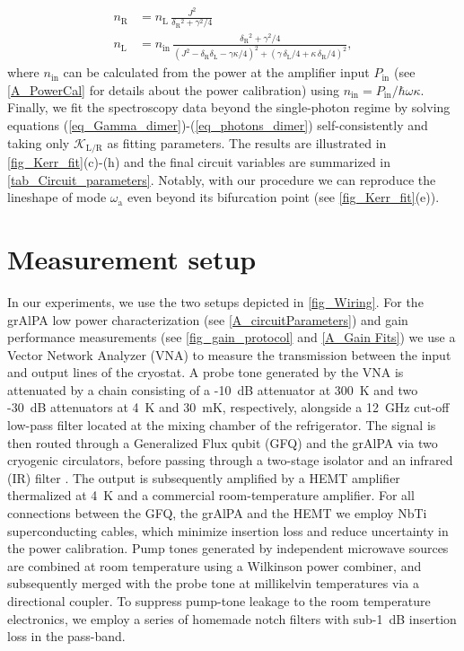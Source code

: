 \documentclass[%
reprint,
floatfix,
superscriptaddress,
amsmath,amssymb,
aps,
pra,
]{revtex4-2}
\begin{document}
\begin{subequations}
\begin{align}
n\mathrm{_{R}} & = n\mathrm{_{L}}\,\frac{J^2}{\delta\mathrm{_R}^2+\gamma^2/4}
\\
n\mathrm{_{L}}  & = n\mathrm{_{in}}\,\frac{\delta\mathrm{_R}^2+\gamma^2/4}{\left(J^2 - \delta\mathrm{_R}\delta\mathrm{_L}-\gamma\kappa/4\right)^2+\left(\gamma\,\delta\mathrm{_L}/4+\kappa\,\delta\mathrm{_R}/4\right)^2},
\end{align}
\label{eq_photons_dimer}
\end{subequations}
%
where $n\mathrm{_{in}}$ can be calculated from the power at the amplifier input $P\mathrm{_{in}}$ (see \cref{A_PowerCal} for details about the power calibration) using $n\mathrm{_{in}}=P\mathrm{_{in}}/\hbar\omega\kappa$. Finally, we fit the spectroscopy data beyond the single-photon regime by solving equations (\ref{eq_Gamma_dimer})-(\ref{eq_photons_dimer}) self-consistently and taking only $\mathcal{K}\mathrm{_{L/R}}$ as fitting parameters. The results are illustrated in \cref{fig_Kerr_fit}(c)-(h) and the final circuit variables are summarized in \cref{tab_Circuit_parameters}. Notably, with our procedure we can reproduce the lineshape of mode $\omega\mathrm{_a}$ even beyond its bifurcation point (see \cref{fig_Kerr_fit}(e)).

\section{Measurement setup}
\label{A_Setup}

In our experiments, we use the two setups depicted in \cref{fig_Wiring}. For the grAlPA low power characterization (see \cref{A_circuitParameters}) and gain performance measurements (see \cref{fig_gain_protocol} and \cref{A_Gain Fits}) we use a Vector Network Analyzer (VNA) to measure the transmission between the input and output lines of the cryostat. A probe tone generated by the VNA is attenuated by a chain consisting of a -10~dB attenuator at 300~K and two -30~dB attenuators at 4~K and 30~mK, respectively, alongside a 12~GHz cut-off low-pass filter located at the mixing chamber of the refrigerator. The signal is then routed through a Generalized Flux qubit (GFQ) and the grAlPA via two cryogenic circulators, before passing through a two-stage isolator and an infrared (IR) filter \cite{HERD}. The output is subsequently amplified by a HEMT amplifier thermalized at 4~K \cite{HEMT_LNF} and a commercial room-temperature amplifier. For all connections between the GFQ, the grAlPA and the HEMT we employ NbTi superconducting cables, which minimize insertion loss and reduce uncertainty in the power calibration. Pump tones generated by independent microwave sources are combined at room temperature using a Wilkinson power combiner, and subsequently merged with the probe tone at millikelvin temperatures via a directional coupler. To suppress pump-tone leakage to the room temperature electronics, we employ a series of homemade notch filters with sub-1~dB insertion loss in the pass-band. 
\end{document}
